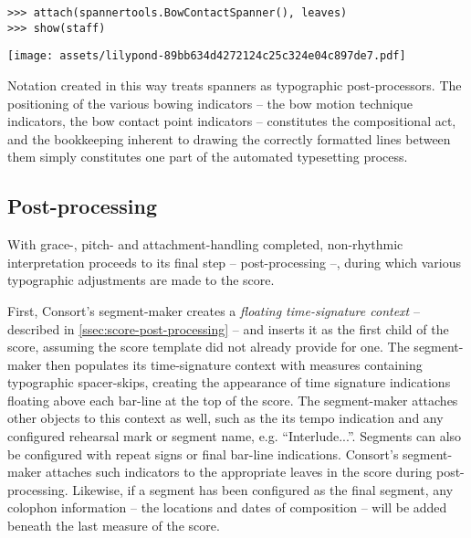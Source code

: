 \begin{comment}
<abjad>
attach(spannertools.BowContactSpanner(), leaves)
show(staff)
</abjad>
\end{comment}

\begin{abjadbookoutput}
\begin{singlespacing}
\vspace{-0.5\baselineskip}
\begin{verbatim}
>>> attach(spannertools.BowContactSpanner(), leaves)
>>> show(staff)
\end{verbatim}
\noindent\texttt{[image: assets/lilypond-89bb634d4272124c25c324e04c897de7.pdf]}
\end{singlespacing}
\end{abjadbookoutput}

\noindent Notation created in this way treats spanners as typographic
post-processors. The positioning of the various bowing indicators -- the bow
motion technique indicators, the bow contact point indicators -- constitutes
the compositional act, and the bookkeeping inherent to drawing the correctly
formatted lines between them simply constitutes one part of the automated
typesetting process.

\subsection{Post-processing}
\label{ssec:post-processing}

With grace-, pitch- and attachment-handling completed, non-rhythmic
interpretation proceeds to its final step -- post-processing --, during which
various typographic adjustments are made to the score.

First, Consort's segment-maker creates a \emph{floating time-signature context}
-- described in \autoref{ssec:score-post-processing} -- and inserts it as the
first child of the score, assuming the score template did not already provide
for one. The segment-maker then populates its time-signature context with
measures containing typographic spacer-skips, creating the appearance of time
signature indications floating above each bar-line at the top of the score. The
segment-maker attaches other objects to this context as well, such as the its
tempo indication and any configured rehearsal mark or segment name, e.g.
\enquote{Interlude...}. Segments can also be configured with repeat signs or
final bar-line indications. Consort's segment-maker attaches such indicators to
the appropriate leaves in the score during post-processing. Likewise, if a
segment has been configured as the final segment, any colophon information --
the locations and dates of composition -- will be added beneath the last
measure of the score.

